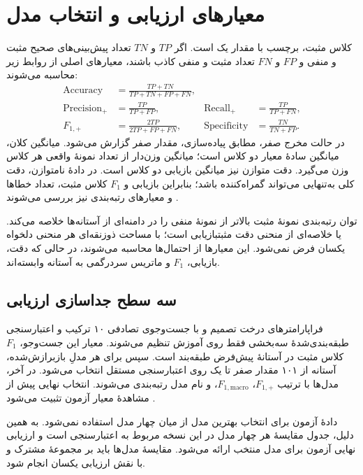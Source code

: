 \section{معیارهای ارزیابی و انتخاب مدل}
\label{sec:metrics}
کلاس مثبت، برچسب  با مقدار یک است. اگر $TP$ و $TN$ تعداد پیش‌بینی‌های صحیح مثبت و منفی و $FP$ و $FN$ تعداد مثبت و منفی کاذب باشند، معیارهای اصلی از روابط زیر محاسبه می‌شوند:
\begin{align}
\mathrm{Accuracy}&=\frac{TP+TN}{TP+TN+FP+FN},\\
\mathrm{Precision}_{+}&=\frac{TP}{TP+FP},&
\mathrm{Recall}_{+}&=\frac{TP}{TP+FN},\\
F_{1,+}&=\frac{2TP}{2TP+FP+FN},&
\mathrm{Specificity}&=\frac{TN}{TN+FP}.
\label{eq:classification-metrics}
\end{align}
در حالت مخرج صفر، مطابق پیاده‌سازی، مقدار صفر گزارش می‌شود. میانگین کلان، میانگین سادۀ معیار دو کلاس است؛ میانگین وزن‌دار از تعداد نمونۀ واقعی هر کلاس وزن می‌گیرد. دقت متوازن نیز میانگین بازیابی دو کلاس است. در دادۀ نامتوازن، دقت کلی به‌تنهایی می‌تواند گمراه‌کننده باشد؛ بنابراین بازیابی و $F_1$ کلاس مثبت، تعداد خطاها و معیارهای رتبه‌بندی نیز بررسی می‌شوند \cite{ref111,ref117,ref118,ref119}.

 توان رتبه‌بندی نمونۀ مثبت بالاتر از نمونۀ منفی را در دامنه‌ای از آستانه‌ها خلاصه می‌کند.  یا  خلاصه‌ای از منحنی دقت مثبت\lr{--}بازیابی است؛ با مساحت ذوزنقه‌ای هر منحنی دلخواه یکسان فرض نمی‌شود. این معیارها از احتمال‌ها محاسبه می‌شوند، در حالی که دقت، بازیابی، $F_1$ و ماتریس سردرگمی به آستانه وابسته‌اند.

\subsection{سه سطح جداسازی ارزیابی}
فراپارامترهای درخت تصمیم و  با جست‌وجوی تصادفی ۱۰ ترکیب و اعتبارسنجی طبقه‌بندی‌شدۀ سه‌بخشی فقط روی آموزش تنظیم می‌شوند. معیار این جست‌وجو، $F_1$ کلاس مثبت در آستانۀ پیش‌فرض طبقه‌بند است. سپس برای هر مدلِ بازبرازش‌شده، آستانه از ۱۰۱ مقدار صفر تا یک روی اعتبارسنجی مستقل انتخاب می‌شود. در آخر، مدل‌ها با ترتیب $F_{1,+}$، $F_{1,\mathrm{macro}}$،  و نام مدل رتبه‌بندی می‌شوند. انتخاب نهایی پیش از مشاهدۀ معیار آزمون تثبیت می‌شود \cite{ref122}.

دادۀ آزمون برای انتخاب بهترین مدل از میان چهار مدل استفاده نمی‌شود. به همین دلیل، جدول مقایسۀ هر چهار مدل در این نسخه مربوط به اعتبارسنجی است و ارزیابی نهایی آزمون برای مدل منتخب ارائه می‌شود. مقایسۀ مدل‌ها باید بر مجموعۀ مشترک و با نقش ارزیابی یکسان انجام شود.
